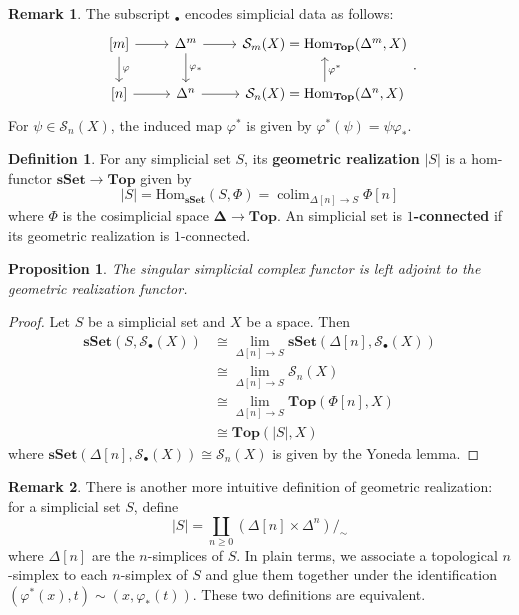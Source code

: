 \documentclass[psamsfonts]{amsart}
\newtheorem{prop}{Proposition}[section]
\theoremstyle{definition}
\newtheorem{defn}{Definition}[section]
\newtheorem{rem}{Remark}[section]
\newcommand{\Top}{\mathbf{Top}}
\newcommand{\sSet}{\mathbf{sSet}}
\newcommand{\Hom}{\mathrm{Hom}}
\DeclareMathOperator{\colim}{colim}
\numberwithin{equation}{section}
\begin{document}
\begin{rem}
The subscript $_\bullet$ encodes simplicial data as follows:
\[\begin{tikzcd}
{[m]}\arrow[d,"\varphi"]\arrow[r]&\Delta^m\arrow[r]\arrow[d,"\varphi_\ast"]&\mathcal{S}_m(X)=\Hom_{\Top}(\Delta^m,X)\\
{[n]}\arrow[r]&\Delta^n\arrow[r]&\mathcal{S}_n(X)=\Hom_{\Top}(\Delta^n,X)\arrow[u,"\varphi^\ast"']
\end{tikzcd}.\]
For $\psi\in\mathcal{S}_n(X)$, the induced map $\varphi^\ast$ is given by $\varphi^\ast(\psi)=\psi\varphi_\ast$.
\end{rem}

\begin{defn}
For any simplicial set $S$, its \textbf{geometric realization} $|S|$ is a hom-functor $\sSet\to\Top$ given by
\[|S|=\Hom_\sSet(S,\Phi)=\colim_{\Delta[n]\to S}\Phi[n]\]
where $\Phi$ is the cosimplicial space $\mathbf{\Delta}\to\Top$. An simplicial set is \textbf{$1$-connected} if its geometric realization is $1$-connected.
\end{defn}

\begin{prop}
The singular simplicial complex functor is left adjoint to the geometric realization functor.
\end{prop}
\begin{proof}
Let $S$ be a simplicial set and $X$ be a space. Then
\begin{align*}
\sSet(S,\mathcal{S}_\bullet(X))&\cong\textstyle{\lim_{\Delta[n]\to S}\sSet(\Delta[n],\mathcal{S}_\bullet(X))}\\
&\cong\textstyle{\lim_{\Delta[n]\to S}\mathcal{S}_n(X)}\\
&\cong\textstyle{\lim_{\Delta[n]\to S}\Top(\Phi[n],X)}\\
&\cong\Top(|S|,X)
\end{align*}
where $\sSet(\Delta[n],\mathcal{S}_\bullet(X))\cong\mathcal{S}_n(X)$ is given by the Yoneda lemma.
\end{proof}

\begin{rem}
There is another more intuitive definition of geometric realization: for a simplicial set $S$, define
\[|S|=\coprod_{n\geq0}(\Delta[n]\times\Delta^n)/_{\sim}\]
where $\Delta[n]$ are the $n$-simplices of $S$. In plain terms, we associate a topological $n$-simplex to each $n$-simplex of $S$ and glue them together under the identification $(\varphi^\ast(x),t)\sim(x,\varphi_\ast(t))$. These two definitions are equivalent.
\end{rem}
\end{document}
